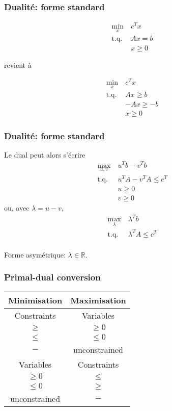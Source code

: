 \documentclass{beamer}
\def\RR{\mathcal{R}}
\def\RR{\mathbb{R}}
\begin{document}
\begin{frame}
	\frametitle{Dualité: forme standard}
	
	\begin{align*}
		\min_x \ & c^T x \\
		\mbox{t.q. } & Ax = b \\
		& x \geq 0
	\end{align*}
	
	revient à
	
	\begin{align*}
		\min_x \ & c^T x \\
		\mbox{t.q. } & Ax \geq b \\
		& -Ax \geq -b \\
		& x \geq 0
	\end{align*}
	
\end{frame}

\begin{frame}
	\frametitle{Dualité: forme standard}
	
	Le dual peut alors s'écrire
	\begin{align*}
		\max_{u, v} \ & u^T b - v^T b \\
		\mbox{t.q. } & u^T A - v^T A \leq c^T \\
		& u \geq 0 \\
		& v \geq 0
	\end{align*}
	ou, avec $\lambda = u - v$,
	\begin{align*}
		\max_{\lambda} \ & \lambda^T b \\
		\mbox{t.q. } & \lambda^T A \leq c^T \\
	\end{align*}
	
	Forme asymétrique: $\lambda \in \RR$.
	
\end{frame}


\begin{frame}
	\frametitle{Primal-dual conversion}
	
	\begin{center}
		\begin{tabular}{|c|c|}
			\hline
			\hline
			{\bf Minimisation} & {\bf Maximisation} \\
			\hline
			\hline
			Constraints & Variables \\
			$\geq$ & $\geq 0$ \\
			$\leq$ & $\leq 0$ \\
			$=$ & unconstrained \\
			\hline
			Variables & Constraints \\
			\hline
			$\geq 0$ & $\leq$ \\
			$\leq 0$ & $\geq$ \\
			unconstrained & $=$ \\
			\hline
		\end{tabular}
	\end{center}
	
\end{frame}
\end{document}
